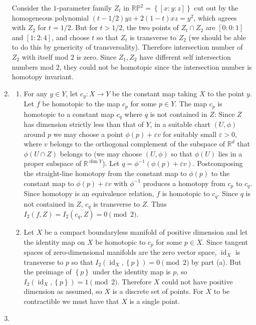 \documentclass[11pt,leqno]{article}
\theoremstyle{plain}
\theoremstyle{definition}
\numberwithin{equation}{section}
\numberwithin{lem}{section}
\newcommand{\cbr}[1]{\left\{#1\right\}}
\DeclareMathOperator{\id}{id}
\begin{document}
\begin{enumerate}
    Consider the $1$-parameter family $Z_t$ in $\mathbb {RP}^2 = \cbr{[x:y:z]}$ cut out by the homogeneous polynomial $(t-1/2)yz + 2(1-t)xz = y^2$, which agrees with $Z_2$ for $t = 1/2$. But for $t>1/2$, the two points of $Z_t\cap Z_2$ are $[0:0:1]$ and $[1:2:4]$, and choose $t$ so that $Z_t$ is transverse to $Z_2$ (we should be able to do this by genericity of transversality). Therefore intersection number of $Z_2$ with itself mod $2$ is zero. Since $Z_1,Z_2$ have different self intersection numbers mod $2$, they could not be homotopic since the intersection number is homotopy invariant.
    \item \begin{enumerate}
        \item For any $y\in Y$, let $c_y\colon X \to Y$ be the constant map taking $X$ to the point $y$. Let $f$ be homotopic to the map $c_p$ for some $p\in Y$. The map $c_p$ is homotopic to a constant map $c_q$ where $q$ is not contained in $Z$: Since $Z$ has dimension strictly less than that of $Y$, in a suitable chart $(U,\phi)$ around $p$ we may choose a point $\phi(p) + \varepsilon v$ for suitably small $\varepsilon> 0$, where $v$ belongs to the orthogonal complement of the subspace of $\mathbb R^d$ that $\phi(U\cap Z)$ belongs to (we may choose $(U,\phi)$ so that $\phi(U)$ lies in a proper subspace of $\mathbb R^{\dim Y}$). Let $q = \phi^{-1}(\phi(p) + \varepsilon v)$. Postcomposing the straight-line homotopy from the constant map to $\phi(p)$ to the constant map to $\phi(p) + \varepsilon v$ with $\phi^{-1}$ produces a homotopy from $c_p$ to $c_q$. Since homotopy is an equivalence relation, $f$ is homotopic to $c_q$. Since $q$ is not contained in $Z$, $c_q$ is transverse to $Z$. Thus $I_2(f,Z) = I_2(c_q,Z) = 0\pmod 2$.
        \item Let $X$ be a compact boundaryless manifold of positive dimension and let the identity map on $X$ be homotopic to $c_p$ for some $p\in X$. Since tangent spaces of zero-dimensional manifolds are the zero vector space, $\id_X$ is transverse to $p$ so that $I_2(\id_X,\cbr{p}) = 0 \pmod{2}$ by part (a). But the preimage of $\cbr{p}$ under the identity map is $p$, so $I_2(\id_X,\cbr{p}) = 1 \pmod{2}$. Therefore $X$ could not have positive dimension as assumed, so $X$ is a discrete set of points. For $X$ to be contractible we must have that $X$ is a single point.
    \end{enumerate}
    \item \begin{enumerate}

\end{enumerate}
\end{enumerate}
\end{document}
